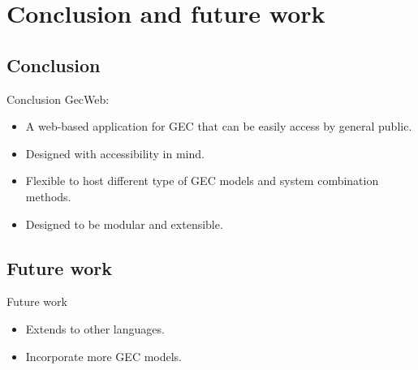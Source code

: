 \section{Conclusion and future work}

\subsection{Conclusion}
\begin{frame}{Conclusion}
  GecWeb:

  \begin{itemize}
    \item A web-based application for GEC that can be easily access by general public.
    \item Designed with accessibility in mind.
    \item Flexible to host different type of GEC models and system combination methods.
    \item Designed to be modular and extensible.
  \end{itemize}
\end{frame}

\subsection{Future work}
\begin{frame}{Future work}
  \begin{itemize}
    \item Extends to other languages.
    \item Incorporate more GEC models.
  \end{itemize}
\end{frame}
